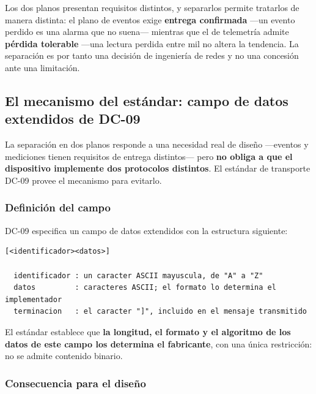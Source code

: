 \begin{cajaclave}[title={La separación como decisión de ingeniería}]
Los dos planos presentan requisitos distintos, y separarlos permite tratarlos de manera distinta: el
plano de eventos exige \textbf{entrega confirmada} ---un evento perdido es una alarma que no suena---
mientras que el de telemetría admite \textbf{pérdida tolerable} ---una lectura perdida entre mil no
altera la tendencia. La separación es por tanto una decisión de ingeniería de redes y no una concesión
ante una limitación.
\end{cajaclave}

\subsection{El mecanismo del estándar: campo de datos extendidos de DC-09}
\label{sec:extdata}

La separación en dos planos responde a una necesidad real de diseño ---eventos y mediciones tienen
requisitos de entrega distintos--- pero \textbf{no obliga a que el dispositivo implemente dos protocolos
distintos}. El estándar de transporte DC-09 provee el mecanismo para evitarlo.

\subsubsection{Definición del campo}

DC-09 especifica un campo de datos extendidos con la estructura siguiente:

\begin{center}
\begin{minipage}{0.88\textwidth}
\begin{lstlisting}
[<identificador><datos>]

  identificador : un caracter ASCII mayuscula, de "A" a "Z"
  datos         : caracteres ASCII; el formato lo determina el implementador
  terminacion   : el caracter "]", incluido en el mensaje transmitido
\end{lstlisting}
\end{minipage}
\end{center}

El estándar establece que \textbf{la longitud, el formato y el algoritmo de los datos de este campo los
determina el fabricante}, con una única restricción: no se admite contenido binario.

\subsubsection{Consecuencia para el diseño}

